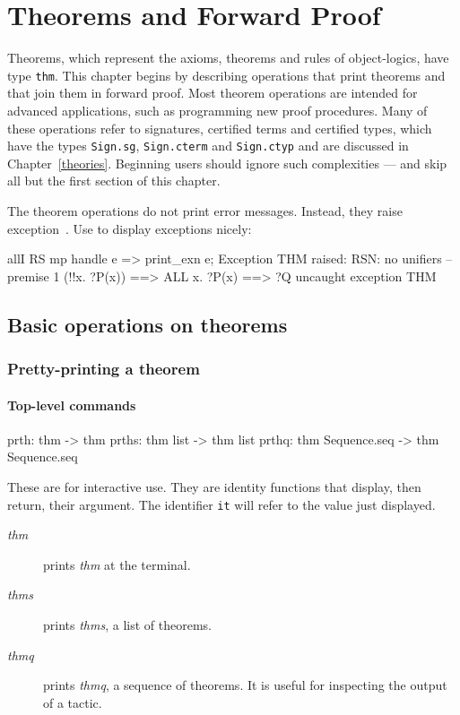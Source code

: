 \chapter{Theorems and Forward Proof}
Theorems, which represent the axioms, theorems and rules of object-logics,
have type {\tt thm}.  This chapter begins by describing
operations that print theorems and that join them in forward proof.  Most
theorem operations are intended for advanced applications, such as
programming new proof procedures.  Many of these operations refer to
signatures, certified terms and certified types, which have the \ML{} types
{\tt Sign.sg}, {\tt Sign.cterm} and {\tt Sign.ctyp} and are discussed in
Chapter~\ref{theories}.  Beginning users should ignore such complexities
--- and skip all but the first section of this chapter.

The theorem operations do not print error messages.  Instead, they raise
exception~\@.  Use  to display
exceptions nicely:
\begin{ttbox} 
allI RS mp  handle e => print_exn e;
{\out Exception THM raised:}
{\out RSN: no unifiers -- premise 1}
{\out (!!x. ?P(x)) ==> ALL x. ?P(x)}
{\out [| ?P --> ?Q; ?P |] ==> ?Q}
{\out}
{\out uncaught exception THM}
\end{ttbox}


\section{Basic operations on theorems}
\subsection{Pretty-printing a theorem}
\subsubsection{Top-level commands}
\begin{ttbox} 
prth: thm -> thm
prths: thm list -> thm list
prthq: thm Sequence.seq -> thm Sequence.seq
\end{ttbox}
These are for interactive use.  They are identity functions that display,
then return, their argument.  The \ML{} identifier {\tt it} will refer to
the value just displayed.
\begin{description}
\item[ {\it thm}]  
prints {\it thm\/} at the terminal.

\item[ {\it thms}]  
prints {\it thms}, a list of theorems.

\item[ {\it thmq}]  
prints {\it thmq}, a sequence of theorems.  It is useful for inspecting
the output of a tactic.
\end{description}

